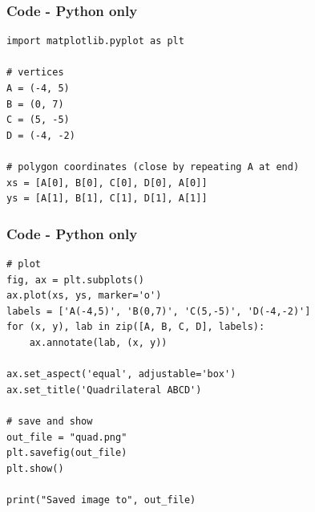 \documentclass{beamer}
\theoremstyle{remark}
\numberwithin{equation}{section}
\begin{document}
\begin{frame}[fragile]
\frametitle{Code - Python only}
\begin{lstlisting}
import matplotlib.pyplot as plt

# vertices
A = (-4, 5)
B = (0, 7)
C = (5, -5)
D = (-4, -2)

# polygon coordinates (close by repeating A at end)
xs = [A[0], B[0], C[0], D[0], A[0]]
ys = [A[1], B[1], C[1], D[1], A[1]]
\end{lstlisting}
\end{frame}
\begin{frame}[fragile]
\frametitle{Code - Python only}
\begin{lstlisting}
# plot
fig, ax = plt.subplots()
ax.plot(xs, ys, marker='o')
labels = ['A(-4,5)', 'B(0,7)', 'C(5,-5)', 'D(-4,-2)']
for (x, y), lab in zip([A, B, C, D], labels):
    ax.annotate(lab, (x, y))

ax.set_aspect('equal', adjustable='box')
ax.set_title('Quadrilateral ABCD')

# save and show
out_file = "quad.png"
plt.savefig(out_file)
plt.show()

print("Saved image to", out_file)


\end{lstlisting}
\end{frame}
\end{document}
